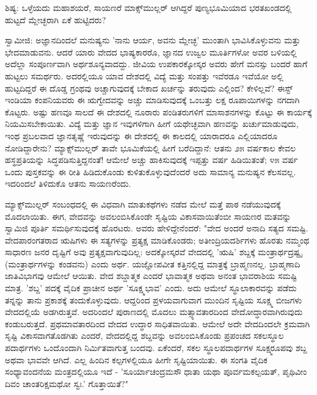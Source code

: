 ಶಿಷ್ಯ: ಒಳ್ಳೆಯದು ಮಹಾಶಯರೆ, ಸಾಯಣರೆ ಮಾಕ್ಸ್‌ಮುಲ್ಲರ್ ಆಗಿದ್ದರೆ ಪುಣ್ಯಭೂಮಿಯಾದ ಭರತಖಂಡದಲ್ಲಿ ಹುಟ್ಟದೆ ಮ್ಲೇಚ್ಛರಾಗಿ ಏಕೆ ಹುಟ್ಟಿದರು?

ಸ್ವಾಮೀಜಿ: ಅಜ್ಞಾನದಿಂದಲೆ ಮನುಷ್ಯನು 'ನಾನು ಆರ್ಯ, ಅವನು ಮ್ಲೇಚ್ಛ' ಮುಂತಾಗಿ ಭಾವಿಸಿಕೊಳ್ಳುವನು ಮತ್ತು ಭೇದಮಾಡುವನು. ಆದರೆ ಯಾರು ವೇದದ ಭಾಷ್ಯಕಾರರೊ, ಜ್ಞಾನದ ಉಜ್ವಲ ಮೂರ್ತಿಗಳೋ ಅವರ ಬಳಿಯಲ್ಲಿ ಅದೆಲ್ಲಾ ಸಂಪೂರ್ಣವಾಗಿ ಅರ್ಥಶೂನ್ಯವಾದದ್ದು. ಜೀವಿಯ ಉಪಕಾರಕ್ಕೋಸ್ಕರ ಅವರು ಹೇಗೆ ಮನಸ್ಸು ಬಂದರೆ ಹಾಗೆ ಹುಟ್ಟಲು ಸಮರ್ಥರು. ಅದರಲ್ಲಿಯೂ ಯಾವ ದೇಶದಲ್ಲಿ ವಿದ್ಯೆ ಮತ್ತು ಸಂಪತ್ತು ಇವೆರಡೂ ಇವೆಯೋ ಅಲ್ಲಿ ಹುಟ್ಟದಿದ್ದರೆ ಈ ದೊಡ್ಡ ಗ್ರಂಥವು ಅಚ್ಚಾಗುವುದಕ್ಕೆ ಬೇಕಾದ ಖರ್ಚನ್ನು ತರುವುದು ಎಲ್ಲಿಂದ? ಕೇಳಿಲ್ಲವೆ? ಈಸ್ಟ್ ಇಂಡಿಯಾ ಕಂಪನಿಯವರು ಈ ಋಗ್ವೇದವನ್ನು ಅಚ್ಚು ಮಾಡಿಸುವುದಕ್ಕೆ ಒಂಬತ್ತು ಲಕ್ಷ ರೂಪಾಯಿಗಳನ್ನು ನಗದಾಗಿ ಕೊಟ್ಟರು. ಅಷ್ಟು ಹಣವೂ ಸಾಲದೆ ಈ ದೇಶದಲ್ಲಿ ನೂರಾರು ಪಂಡಿತರುಗಳಿಗೆ ಮಾಸಾಶನಗಳನ್ನು ಕೊಟ್ಟು ಈ ಕಾರ್ಯಕ್ಕೆ ನಿಯಮಿಸಬೇಕಾಯಿತು. ವಿದ್ಯೆ ಮತ್ತು ಜ್ಞಾನ ಇವುಗಳಿಗಾಗಿ ಹೀಗೆ ಯಥೇಚ್ಛವಾಗಿ ಹಣವನ್ನು ಖರ್ಚುಮಾಡುವುದು, ಇಂಥ ಪ್ರಬಲವಾದ ಜ್ಞಾನತೃಷ್ಣೆ ಇರುವುದನ್ನು ಈ ದೇಶದಲ್ಲಿ ಈ ಕಾಲದಲ್ಲಿ ಯಾರಾದರೂ ಎಲ್ಲಿಯಾದರೂ ನೋಡಿದ್ದಾರೇನು? ಮ್ಯಾಕ್ಸ್‌ಮುಲ್ಲರ್ ತಾವೇ ಭೂಮಿಕೆಯಲ್ಲಿ ಹೀಗೆ ಬರೆದಿದ್ದಾನೆ: ಆತನು ೨೫ ವರ್ಷಕಾಲ ಕೇವಲ ಹಸ್ಥಪ್ರತಿಯನ್ನು ಸಿದ್ಧಪಡಿಸುತ್ತಿದ್ದನಂತೆ! ಆಮೇಲೆ ಅಚ್ಚು ಹಾಕಿಸುವುದಕ್ಕೆ ಇಪ್ಪತ್ತು ವರ್ಷ ಹಿಡಿಯಿತಂತೆ; ೪೫ ವರ್ಷ ಒಂದು ಪುಸ್ತಕವನ್ನು ಈ ರೀತಿ ಹಿಡಿದುಕೊಂಡು ಕುಳಿತುಕೊಳ್ಳುವುದೆಂದರೆ ಅದು ಸಾಮಾನ್ಯ ಮನುಷ್ಯನ ಕೆಲಸವಲ್ಲ. ಇದರಿಂದಲೆ ತಿಳಿದುಕೊ ಆತನು ಸಾಯಣರೆಂದು.

ಮ್ಯಾಕ್ಸ್‌ಮುಲ್ಲರ್ ಸಂಬಂಧದಲ್ಲಿ ಈ ವಿಧವಾಗಿ ಮಾತುಕಥೆಗಳು ನಡೆದ ಮೇಲೆ ಮತ್ತೆ ಪಾಠ ನಡೆಯುವುದಕ್ಕೆ ಮೊದಲಾಯಿತು. ಈಗ, ವೇದವನ್ನು ಅವಲಂಬಿಸಿಕೊಂಡೇ ಸೃಷ್ಟಿಯ ವಿಕಾಸವಾಯಿತೆಂಬೀ ಸಾಯಣರ ಮತವನ್ನು ಸ್ವಾಮಿಜಿ ಪೂರ್ತಿ ಸಮರ್ಥಿಸುವುದಕ್ಕೆ ಹೊರಟರು. ಅವರು ಹೇಳಿದ್ದೇನೆಂದರೆ: "ವೇದ ಅಂದರೆ ಅನಾದಿ ಸತ್ಯದ ಸಮಷ್ಟಿ. ವೇದಪಾರಂಗತರಾದ ಋಷಿಗಳು ಈ ಸತ್ಯಗಳನ್ನು ಪ್ರತ್ಯಕ್ಷ ಮಾಡಿಕೊಂಡರು; ಅತೀಂದ್ರಿಯದರ್ಶಿಗಳು ಹೊರತು ನಮ್ಮಂಥ ಸಾಧಾರಣ ಜನರ ದೃಷ್ಟಿಗೆ ಅವು ಪ್ರತ್ಯಕ್ಷವಾಗುವುದಿಲ್ಲ: ಅದಕ್ಕೋಸ್ಕರವೆ ವೇದದಲ್ಲಿ 'ಋಷಿ' ಶಬ್ದಕ್ಕೆ ಮಂತ್ರಾರ್ಥದ್ರಷ್ಟೃ (ಮಂತ್ರಾರ್ಥಗಳನ್ನು ಕಂಡವನು) ಎಂದು ಅರ್ಥ. ಯಜ್ಞೋಪವೀತ ಕತ್ತಿನಲ್ಲಿದ್ದ ಮಾತ್ರಕ್ಕೆ ಬ್ರಾಹ್ಮಣನಲ್ಲ. ಬ್ರಾಹ್ಮಣಾದಿ ಜಾತಿವಿಭಾಗವು ಆಮೇಲೆ ಆಯಿತು. ವೇದ ಶಬ್ದಾತ್ಮಕ ಎಂದರೆ ಭಾವಾತ್ಮಕ ಅಥವಾ ಅನಂತ ಭಾವರಾಶಿಯ ಸಮಷ್ಟಿ ಮಾತ್ರ. 'ಶಬ್ದ' ಪದಕ್ಕೆ ವೈದಿಕ ಪ್ರಾಚೀನ ಅರ್ಥ 'ಸೂಕ್ಷ್ಮಭಾವ' ಎಂದು. ಅದು ಆಮೇಲೆ ಸ್ಥೂಲಾಕಾರವನ್ನು ಪಡೆದು ತನ್ನನ್ನು ತಾನು ಪ್ರಕಾಶಕ್ಕೆ ತಂದುಕೊಳ್ಳುವುದು. ಆದ್ದರಿಂದ ಪ್ರಳಯವಾಗುವಾಗ ಮುಂದಿನ ಸೃಷ್ಟಿಯ ಸೂಕ್ಷ್ಮ ಬೀಜಗಳು ವೇದದಲ್ಲಿಯೆ ಅಡಗಿರುತ್ತವೆ. ಅದರಿಂದಲೆ ಪುರಾಣದಲ್ಲಿ ಮೊದಲು ಮತ್ಸ್ಯಾವತಾರದಿಂದ ವೇದೋದ್ಧಾರವಾಗಿರುವುದು ಕಂಡುಬರುತ್ತದೆ. ಪ್ರಥಮಾವತಾರದಿಂದ ವೇದದ ಉದ್ಧಾರ ಸಾಧಿತವಾಯಿತು. ಆಮೇಲೆ ಅದೇ ವೇದದಿಂದಲೇ ಕ್ರಮವಾಗಿ ಸೃಷ್ಟಿ ವಿಕಾಸವಾಗತೊಡಗಿತು ಎಂದರೆ, ವೇದದಲ್ಲಿದ್ದ ಶಬ್ದವನ್ನು ಅವಲಂಬಿಸಿಕೊಂಡು ಪ್ರಪಂಚದ ಸಕಲಸ್ಥೂಲ ಪದಾರ್ಥಗಳು ಒಂದೊಂದಾಗಿ ನಿರ್ಮಿತವಾಗುತ್ತ ಬಂದವು. ಏಕೆಂದರೆ, ಸಕಲ ಸ್ಥೂಲಪದಾರ್ಥಗಳ ಸೂಕ್ಷ್ಮರೂಪವು ಶಬ್ದ ಅಥವಾ ಭಾವವೇ ಆಗಿದೆ. ಎಲ್ಲ ಹಿಂದಿನ ಕಲ್ಪಗಳಲ್ಲಿಯೂ ಹೀಗೇ ಸೃಷ್ಟಿಯಾಯಿತು. ಈ ಸಂಗತಿ ವೈದಿಕ ಸಂಧ್ಯಾವಂದನೆಯ ಮಂತ್ರದಲ್ಲಿಯೂ ಇದೆ - 'ಸೂರ್ಯಾಚಂದ್ರಮಸೌ ಧಾತಾ ಯಥಾ ಪೂರ್ವಮಕಲ್ಪಯತ್, ಪೃಥಿವೀಂ ದಿವಂ ಚಾಂತರಿಕ್ಷಮಥೋ ಸ್ವಃ.' ಗೊತ್ತಾಯಿತೆ?"

